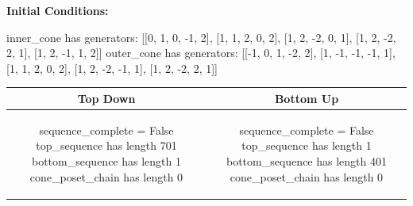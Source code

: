 \documentclass[10pt]{article}
\begin{document}
\textbf{Initial Conditions:}
\begin{SAGE}
inner_cone has generators: 
[[0, 1, 0, -1, 2], [1, 1, 2, 0, 2], [1, 2, -2, 0, 1], [1, 2, -2, 2, 1], [1, 2, -1, 1, 2]]
outer_cone has generators: 
[[-1, 0, 1, -2, 2], [1, -1, -1, -1, 1], [1, 1, 2, 0, 2], [1, 2, -2, -1, 1], [1, 2, -2, 2, 1]]

\end{SAGE}
\begin{tabular}{c|c}
\textbf{Top Down} & \textbf{Bottom Up} \\ \hline  
\begin{SAGE}
sequence_complete = False
top_sequence has length 701
bottom_sequence has length 1
cone_poset_chain has length 0
\end{SAGE} 
&
\begin{SAGE}
sequence_complete = False
top_sequence has length 1
bottom_sequence has length 401
cone_poset_chain has length 0
\end{SAGE} 
\\ \hline


\end{tabular}
\end{document}
